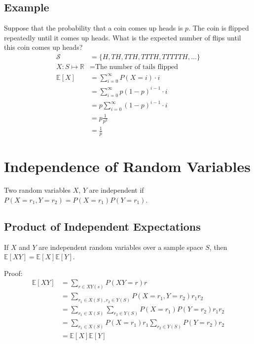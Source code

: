 \documentclass{article}
\theoremstyle{mytheoremstyle}
\theoremstyle{mytheoremstyle}
\theoremstyle{myproblemstyle}
\begin{document}
    \subsection*{Example}
    Suppose that the probability that a coin comes up heads is $p$. The coin is
    flipped repeatedly until it comes up heads. What is the expected number of
    flips until this coin comes up heads?
    \begin{align*}
        \mathcal{S} &= \{H, TH, TTH, TTTH, TTTTTH, \dots \} \\
        X: S \mapsto \mathbb{R} &= \text{The number of tails flipped}\\
        \mathbb{E}[X] &= \sum_{i=0}^{\infty} P(X=i) \cdot i \\
                      &= \sum_{i=0}^{\infty} p(1-p)^{i-1} \cdot i \\
                      &= p\sum_{i=0}^{\infty} (1-p)^{i-1} \cdot i \\
                      &= p \frac{1}{p^2} \\
                      &= \frac{1}{p}
    \end{align*}

    \section*{Independence of Random Variables}
    Two random variables $X$, $Y$ are independent if $P(X=r_1,
    Y=r_2)=P(X=r_1)P(Y=r_1)$.

    \subsection*{Product of Independent Expectations}
    If $X$ and $Y$ are independent random variables over a sample space $S$,
    then $\mathbb{E}[XY] = \mathbb{E}[X] \mathbb{E}[Y]$.

    Proof:
    \begin{align*}
        \mathbb{E}[XY] &= \sum_{r\in XY(s)} P(XY=r)r \\
                       &= \sum_{r_1\in X(S), r_2\in Y(S)} P(X=r_1, Y=r_2)r_1r_2 \\
                       &= \sum_{r_1\in X(S)} \sum_{r_2\in Y(S)} P(X=r_1)P(Y=r_2)r_1r_2 \\
                       &= \sum_{r_1\in X(S)} P(X=r_1)r_1 \sum_{r_2\in Y(S)} P(Y=r_2)r_2 \\
                       &= \mathbb{E}[X] \mathbb{E}[Y]
    \end{align*}
\end{document}
